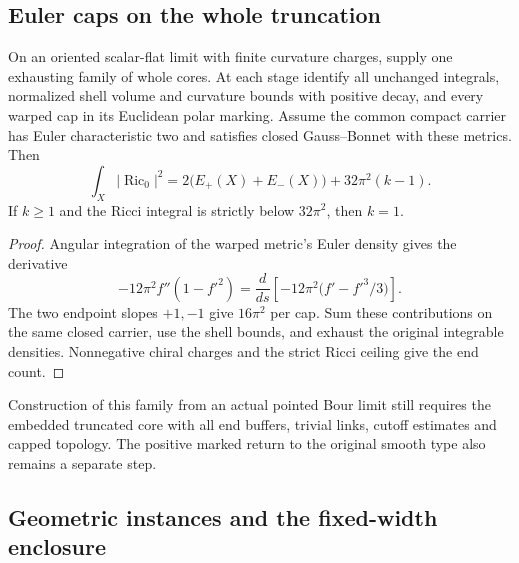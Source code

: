 \subsection{Euler caps on the whole truncation}

\begin{proposition}
\label{prop:ed07-closed-cap-euler}
\leanok
On an oriented scalar-flat limit with finite curvature charges,
supply one exhausting family of whole cores. At each stage identify
all unchanged integrals, normalized shell volume and curvature bounds
with positive decay, and every warped cap in its Euclidean polar
marking. Assume the common compact carrier has Euler characteristic
two and satisfies closed Gauss--Bonnet with these metrics. Then
\[
 \int_X |\operatorname{Ric}_0|^2
 =2\bigl(E_+(X)+E_-(X)\bigr)+32\pi^2(k-1).
\]
If $k\ge1$ and the Ricci integral is strictly below $32\pi^2$,
then $k=1$.
\end{proposition}
\begin{proof}
\leanok
Angular integration of the warped metric's Euler density gives the derivative
\[
  -12\pi^2 f''(1-f'^2)
  = \frac{d}{ds}\left[-12\pi^2\bigl(f'-f'^3/3\bigr)\right].
\]
The two endpoint slopes $+1,-1$ give
$16\pi^2$ per cap. Sum these contributions on the same closed carrier,
use the shell bounds, and exhaust the original integrable densities.
Nonnegative chiral charges and the strict Ricci ceiling give the end count.
\end{proof}

Construction of this family from an actual pointed Bour limit still
requires the embedded truncated core with all end buffers, trivial
links, cutoff estimates and capped topology. The positive marked
return to the original smooth type also remains a separate step.

\subsection{Geometric instances and the fixed-width enclosure}

